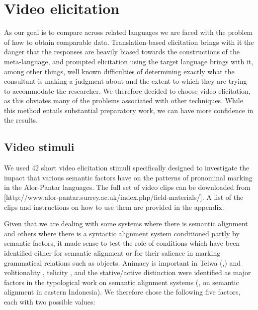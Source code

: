 \section{Video elicitation}
\label{sec:10:4}
As our goal is to compare across related languages we are faced with the problem of how to obtain comparable data. Translation-based elicitation brings with it the danger that the responses are heavily biased towards the constructions of the meta-language, and prompted elicitation using the target language brings with it, among other things, well known difficulties of determining exactly what the consultant is making a judgment about and the extent to which they are trying to accommodate the researcher. We therefore decided to choose video elicitation, as this obviates many of the problems associated with other techniques. While this method entails substantial preparatory work, we can have more confidence in the results.

\subsection{Video stimuli} 
\label{sec:10:4.1}
We used 42 short video elicitation stimuli specifically designed to investigate the impact that various semantic factors have on the patterns of pronominal marking in the Alor-Pantar languages. The full set of video clips can be downloaded from [http://www.alor-pantar.surrey.ac.uk/index.php/field-materials/]. A list of the clips and instructions on how to use them are provided in the appendix.

  Given that we are dealing with some systems where there is semantic alignment and others where there is a syntactic alignment system conditioned partly by semantic factors, it made sense to test the role of conditions which have been identified either for semantic alignment or for their salience in marking grammatical relations such as objects. Animacy  is important in Teiwa (\citet[171]{Klamer2010},\citet{KlamerEtAl2006}) and volitionality , telicity , and the stative/active distinction were identified as major factors in the typological work on semantic alignment  systems (\citet{Arkadiev2008}, \citet{Klamer2008} on semantic alignment in eastern Indonesia). We therefore chose the following five factors, each with two possible values:
  
